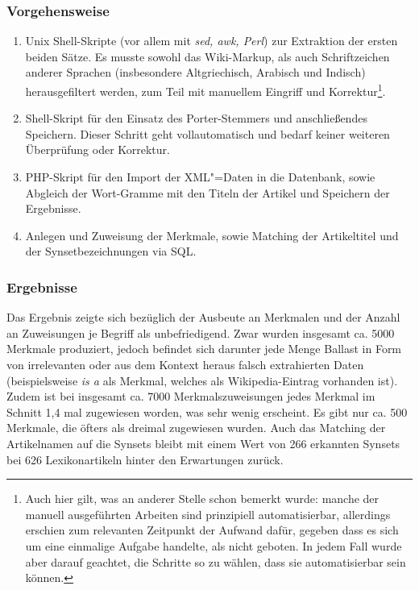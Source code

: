 \documentclass[pagesize,paper=A4,DIV=calc,fontsize=12pt,draft=false]{scrreprt}
\begin{document}
\subsubsection{Vorgehensweise}

\begin{enumerate}
\item Unix Shell-Skripte (vor allem mit \emph{sed, awk, Perl}) zur Extraktion der ersten beiden Sätze. 
Es musste sowohl das Wiki-Markup, als auch Schriftzeichen anderer Sprachen (insbesondere Altgriechisch, Arabisch und Indisch) herausgefiltert werden, zum Teil mit manuellem Eingriff und Korrektur\footnote{Auch hier gilt, was an anderer Stelle schon bemerkt wurde: manche der manuell ausgeführten Arbeiten sind prinzipiell automatisierbar, allerdings erschien zum relevanten Zeitpunkt der Aufwand dafür, gegeben dass es sich um eine einmalige Aufgabe handelte, als nicht geboten. 
In jedem Fall wurde aber darauf geachtet, die Schritte so zu wählen, dass sie automatisierbar sein können.}.
\item Shell-Skript für den Einsatz des Porter-Stemmers und anschließendes Speichern. 
Dieser Schritt geht vollautomatisch und bedarf keiner weiteren Überprüfung oder Korrektur.
\item PHP-Skript für den Import der XML"=Daten in die Datenbank, sowie Abgleich der Wort-Gramme mit den Titeln der Artikel und Speichern der Ergebnisse.
\item Anlegen und Zuweisung der Merkmale, sowie Matching der Artikeltitel und der Synsetbezeichnungen via SQL. 
\end{enumerate}

\subsubsection{Ergebnisse}

Das Ergebnis zeigte sich bezüglich der Ausbeute an Merkmalen und der Anzahl an Zuweisungen je Begriff als unbefriedigend. 
Zwar wurden insgesamt ca. 5000 Merkmale produziert, jedoch befindet sich darunter jede Menge Ballast in Form von irrelevanten oder aus dem Kontext heraus falsch extrahierten Daten (beispielsweise \emph{is a} als Merkmal, welches als Wikipedia-Eintrag vorhanden ist). 
Zudem ist bei insgesamt ca. 7000 Merkmalszuweisungen jedes Merkmal im Schnitt 1,4 mal zugewiesen worden, was sehr wenig erscheint. 
Es gibt nur ca. 500 Merkmale, die öfters als dreimal zugewiesen wurden. 
Auch das Matching der Artikelnamen auf die Synsets bleibt mit einem Wert von 266 erkannten Synsets bei 626 Lexikonartikeln hinter den Erwartungen zurück. 
\end{document}
